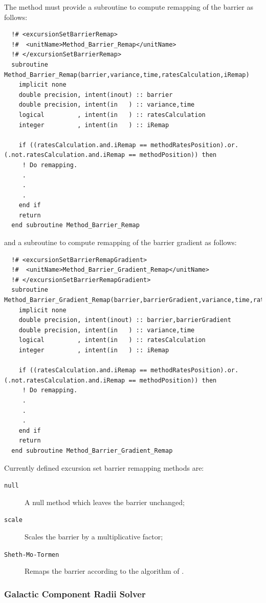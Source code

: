 The method must provide a subroutine to compute remapping of the barrier as follows:
\begin{verbatim}
  !# <excursionSetBarrierRemap>
  !#  <unitName>Method_Barrier_Remap</unitName>
  !# </excursionSetBarrierRemap>
  subroutine Method_Barrier_Remap(barrier,variance,time,ratesCalculation,iRemap)
    implicit none
    double precision, intent(inout) :: barrier
    double precision, intent(in   ) :: variance,time
    logical         , intent(in   ) :: ratesCalculation
    integer         , intent(in   ) :: iRemap

    if ((ratesCalculation.and.iRemap == methodRatesPosition).or.(.not.ratesCalculation.and.iRemap == methodPosition)) then
     ! Do remapping.
     .
     .
     .
    end if
    return
  end subroutine Method_Barrier_Remap
\end{verbatim}
and a subroutine to compute remapping of the barrier gradient as follows:
\begin{verbatim}
  !# <excursionSetBarrierRemapGradient>
  !#  <unitName>Method_Barrier_Gradient_Remap</unitName>
  !# </excursionSetBarrierRemapGradient>
  subroutine Method_Barrier_Gradient_Remap(barrier,barrierGradient,variance,time,ratesCalculation,iRemap)
    implicit none
    double precision, intent(inout) :: barrier,barrierGradient
    double precision, intent(in   ) :: variance,time
    logical         , intent(in   ) :: ratesCalculation
    integer         , intent(in   ) :: iRemap

    if ((ratesCalculation.and.iRemap == methodRatesPosition).or.(.not.ratesCalculation.and.iRemap == methodPosition)) then
     ! Do remapping.
     .
     .
     .
    end if
    return
  end subroutine Method_Barrier_Gradient_Remap
\end{verbatim}

Currently defined excursion set barrier remapping methods are:
\begin{description}
 \item [{\tt null}] A null method which leaves the barrier unchanged;
 \item [{\tt scale}] Scales the barrier by a multiplicative factor;
 \item [{\tt Sheth-Mo-Tormen}] Remaps the barrier according to the algorithm of \cite{sheth_ellipsoidal_2001}.
\end{description}

\subsubsection{Galactic Component Radii Solver}\label{sec:galactic_radii_solvers}

